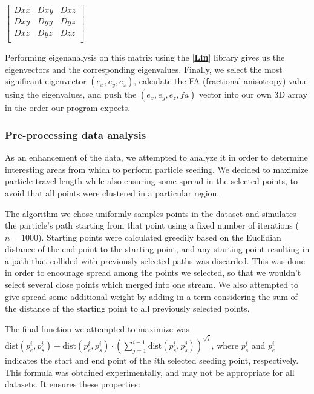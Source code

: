 \documentclass{article}
\newcommand{\code}[1]{\fcolorbox{codebd}{codebg}{\lstinline[basicstyle=\ttfamily\color{codefg}]{#1}}}
\newcommand{\reference}[1]{[\hyperref[ref:#1]{\textbf{#1}}]}
\begin{document}
\hspace{1cm}
\(\begin{bmatrix}
    Dxx & Dxy & Dxz \\
    Dxy & Dyy & Dyz \\
    Dxz & Dyz & Dzz \\
\end{bmatrix}\)

Performing eigenanalysis on this matrix using the \code{nalgebra} \reference{Lin} library gives us the eigenvectors and the corresponding eigenvalues. Finally, we select the most significant eigenvector \((e_x,e_y,e_z)\), calculate the FA (fractional anisotropy) value using the eigenvalues, and push the \((e_x, e_y, e_z, fa)\) vector into our own 3D array in the order our program expects.


\subsubsection*{Pre-processing data analysis}\label{sec:prepro}

As an enhancement of the data, we attempted to analyze it in order to determine interesting areas from which to perform particle seeding. We decided to maximize particle travel length while also ensuring some spread in the selected points, to avoid that all points were clustered in a particular region.

The algorithm we chose uniformly samples points in the dataset and simulates the particle's path starting from that point using a fixed number of iterations (\(n = 1000\)). Starting points were calculated greedily based on the Euclidian distance of the end point to the starting point, and any starting point resulting in a path that collided with previously selected paths was discarded. This was done in order to encourage spread among the points we selected, so that we wouldn't select several close points which merged into one stream. We also attempted to give spread some additional weight by adding in a term considering the sum of the distance of the starting point to all previously selected points.

The final function we attempted to maximize was \(\textrm{dist}(p_e^i, p_s^i) + \textrm{dist}(p_e^i, p_s^i)\cdot{(\sum_{j=1}^{i-1}{\textrm{dist}(p_s^i, p_s^j)})}^{\sqrt{i}}\), where \(p_s^i\) and \(p_e^i\) indicates the start and end point of the \(i\)th selected seeding point, respectively. This formula was obtained experimentally, and may not be appropriate for all datasets. It ensures these properties:
\end{document}
